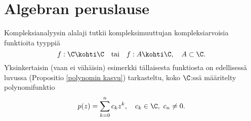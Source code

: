 \section{Algebran peruslause} \label{III-3}
\alku

%
Kompleksianalyysin alalaji  tutkii kompleksimuuttujan kompleksiarvoisia 
funktioita tyyppiä
\[
f: \C \kohti \C \quad \text{tai} \quad f: A \kohti \C, \quad A\subset\C.
\]
Yksinkertaisin (vaan ei vähäisin) esimerkki tällaisesta funktiosta on edellisessä luvussa
(Propositio \ref{polynomin kasvu}) tarkasteltu, koko $\C$:ssä määritelty polynomifunktio
\begin{equation} \label{polynomi}
p(z) = \sum_{k=0}^n c_k z^k, \quad c_k \in \C, \ c_n \neq 0.
\end{equation}

